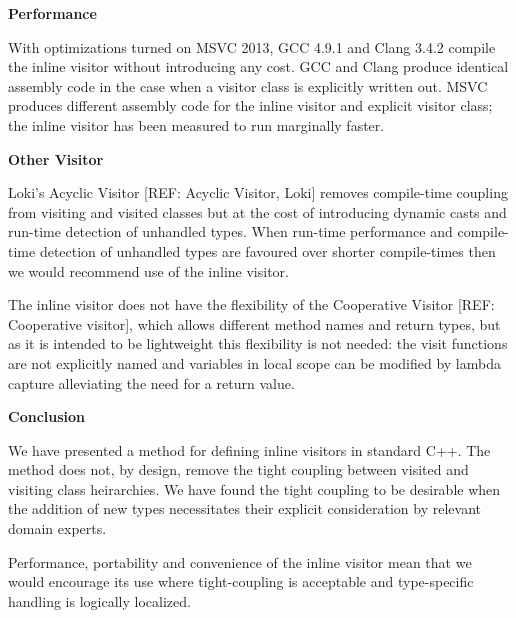 \documentclass[10pt,a4paper]{article}
\renewcommand\section[1]{
    \begin{minipage}[c]{0.94\linewidth}
    \large \raggedright \sffamily \textbf{#1}
    \end{minipage}
}
\begin{document}
\section{Performance}

With optimizations turned on MSVC 2013, GCC 4.9.1 and Clang 3.4.2 compile the
inline visitor without introducing any cost. GCC and Clang produce identical
assembly code in the case when a visitor class is explicitly written out. MSVC
produces different assembly code for the inline visitor and explicit visitor
class; the inline visitor has been measured to run marginally faster.


\section{Other Visitor}

Loki's Acyclic Visitor [REF: Acyclic Visitor, Loki] removes compile-time coupling
from visiting and visited classes but at the cost of introducing dynamic casts
and run-time detection of unhandled types. When run-time performance and
compile-time detection of unhandled types are favoured over shorter
compile-times then we would recommend use of the inline visitor.

The inline visitor does not have the flexibility of the Cooperative Visitor
[REF: Cooperative visitor], which allows different method names and return
types, but as it is intended to be lightweight this flexibility is not needed:
the visit functions are not explicitly named and variables in local scope can
be modified by lambda capture alleviating the need for a return value. 


\section{Conclusion}

We have presented a method for defining inline visitors in standard C++. The
method does not, by design, remove the tight coupling between visited and
visiting class heirarchies. We have found the tight coupling to be desirable
when the addition of new types necessitates their explicit consideration by
relevant domain experts. 

Performance, portability and convenience of the inline visitor mean that we
would encourage its use where tight-coupling is acceptable and type-specific
handling is logically localized.
\end{document}
